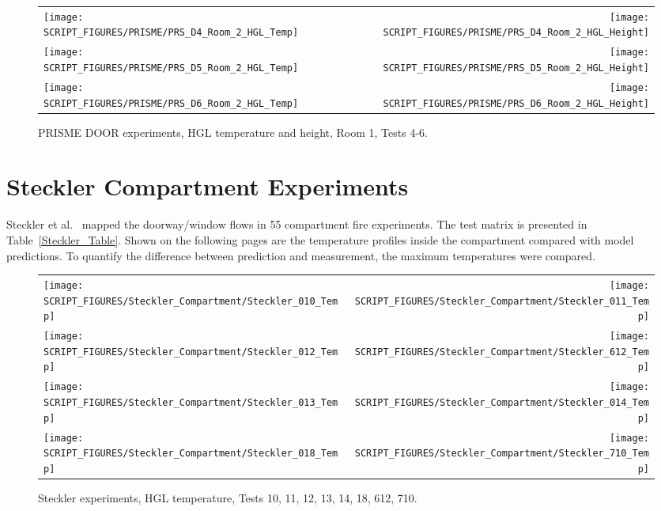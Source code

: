 \begin{figure}[p]
\begin{tabular*}{\textwidth}{l@{\extracolsep{\fill}}r}
\texttt{[image: SCRIPT\_FIGURES/PRISME/PRS\_D4\_Room\_2\_HGL\_Temp]} &
\texttt{[image: SCRIPT\_FIGURES/PRISME/PRS\_D4\_Room\_2\_HGL\_Height]} \\
\texttt{[image: SCRIPT\_FIGURES/PRISME/PRS\_D5\_Room\_2\_HGL\_Temp]} &
\texttt{[image: SCRIPT\_FIGURES/PRISME/PRS\_D5\_Room\_2\_HGL\_Height]} \\
\texttt{[image: SCRIPT\_FIGURES/PRISME/PRS\_D6\_Room\_2\_HGL\_Temp]} &
\texttt{[image: SCRIPT\_FIGURES/PRISME/PRS\_D6\_Room\_2\_HGL\_Height]}
\end{tabular*}
\caption[PRISME DOOR experiments, HGL temperature and height, Room 2, Tests 4-6]
{PRISME DOOR experiments, HGL temperature and height, Room 1, Tests 4-6.}
\label{PRISME_HGL_4}
\end{figure}


\clearpage

\section{Steckler Compartment Experiments}

Steckler et al.~\cite{Steckler:NBSIR_82-2520} mapped the doorway/window flows in 55 compartment fire experiments. The test matrix is presented in Table~\ref{Steckler_Table}. Shown on the following pages are the temperature profiles inside the compartment compared with model predictions. To quantify the difference between prediction and measurement, the maximum temperatures were compared.

\newpage

\begin{figure}[p]
\begin{tabular*}{\textwidth}{l@{\extracolsep{\fill}}r}
\texttt{[image: SCRIPT\_FIGURES/Steckler\_Compartment/Steckler\_010\_Temp]} &
\texttt{[image: SCRIPT\_FIGURES/Steckler\_Compartment/Steckler\_011\_Temp]} \\
\texttt{[image: SCRIPT\_FIGURES/Steckler\_Compartment/Steckler\_012\_Temp]} &
\texttt{[image: SCRIPT\_FIGURES/Steckler\_Compartment/Steckler\_612\_Temp]} \\
\texttt{[image: SCRIPT\_FIGURES/Steckler\_Compartment/Steckler\_013\_Temp]} &
\texttt{[image: SCRIPT\_FIGURES/Steckler\_Compartment/Steckler\_014\_Temp]} \\
\texttt{[image: SCRIPT\_FIGURES/Steckler\_Compartment/Steckler\_018\_Temp]} &
\texttt{[image: SCRIPT\_FIGURES/Steckler\_Compartment/Steckler\_710\_Temp]}
\end{tabular*}
\caption[Steckler experiments, HGL temperature, Tests 10, 11, 12, 13, 14, 18, 612, 710]
{Steckler experiments, HGL temperature, Tests 10, 11, 12, 13, 14, 18, 612, 710.}
\label{Steckler_Temp_1}
\end{figure}

